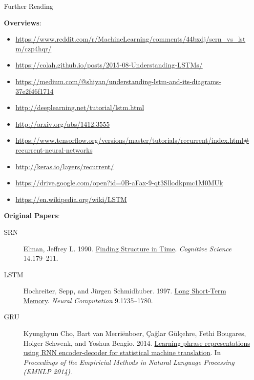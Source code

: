 \documentclass[xcolor=pdftex,x11names,table,hyperref]{beamer}
\begin{document}
\begin{frame}{Further Reading}

\textbf{Overviews}: \\[0.5em]
\begin{minipage}{1.1\textwidth}
\begin{tiny}
\begin{itemize}
	\item \url{https://www.reddit.com/r/MachineLearning/comments/44bxdj/scrn\_vs\_lstm/czp4hqr/}
	\item \url{https://colah.github.io/posts/2015-08-Understanding-LSTMs/}
	\item \url{https://medium.com/@shiyan/understanding-lstm-and-its-diagrams-37e2f46f1714}
	\item \url{http://deeplearning.net/tutorial/lstm.html}
	\item \url{http://arxiv.org/abs/1412.3555}
	\item \url{https://www.tensorflow.org/versions/master/tutorials/recurrent/index.html\#recurrent-neural-networks}
	\item \url{http://keras.io/layers/recurrent/}
	\item \url{https://drive.google.com/open?id=0B-aFax-9-qt3Sllodkpmc1M0MUk}
	\item \url{https://en.wikipedia.org/wiki/LSTM}
\end{itemize}
\end{tiny}
\end{minipage}

\vspace{1.0em}
\textbf{Original Papers}:
\begin{tiny}
\begin{description}
	\item[SRN] Elman, Jeffrey L. 1990. \href{http://citeseerx.ist.psu.edu/viewdoc/summary?doi=10.1.1.28.9476}{Finding Structure in Time}. \textit{Cognitive Science} 14.179--211.
	\item[LSTM] Hochreiter, Sepp, and J\"{u}rgen Schmidhuber. 1997. \href{http://deeplearning.cs.cmu.edu/pdfs/Hochreiter97_lstm.pdf}{Long Short-Term Memory}. \textit{Neural Computation} 9.1735--1780.
	\item[GRU] Kyunghyun Cho, Bart van Merri\"{e}nboer, \c{C}a\u{g}lar G\"{u}l\c{c}ehre, Fethi Bougares, Holger Schwenk, and Yoshua Bengio. 2014. \href{https://arxiv.org/abs/1406.1078}{Learning phrase representations using RNN encoder-decoder for statistical machine translation}. In \textit{Proceedings of the Empiricial Methods in Natural Language Processing (EMNLP 2014)}.
\end{description}
\end{tiny}
\end{frame}


\end{document}
